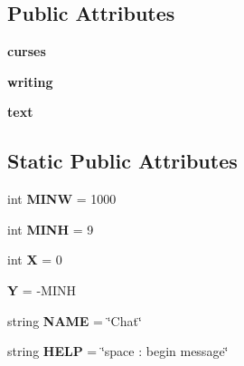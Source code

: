 \subsection*{\-Public \-Attributes}
\begin{DoxyCompactItemize}
\item 
\hypertarget{classplugins_1_1chatcurses_1_1_chat_view_af4b6464f13631f2ace71c8df8af327a5}{{\bfseries curses}}\label{classplugins_1_1chatcurses_1_1_chat_view_af4b6464f13631f2ace71c8df8af327a5}

\item 
\hypertarget{classplugins_1_1chatcurses_1_1_chat_view_a9c13ec017f5022a2679d474b7baef095}{{\bfseries writing}}\label{classplugins_1_1chatcurses_1_1_chat_view_a9c13ec017f5022a2679d474b7baef095}

\item 
\hypertarget{classplugins_1_1chatcurses_1_1_chat_view_aa60bbf0e97d3dc2834fe57944bd6a865}{{\bfseries text}}\label{classplugins_1_1chatcurses_1_1_chat_view_aa60bbf0e97d3dc2834fe57944bd6a865}

\end{DoxyCompactItemize}
\subsection*{\-Static \-Public \-Attributes}
\begin{DoxyCompactItemize}
\item 
\hypertarget{classplugins_1_1chatcurses_1_1_chat_view_a1cd296631cf6060c3a3ac9e1c34882e2}{int {\bfseries \-M\-I\-N\-W} = 1000}\label{classplugins_1_1chatcurses_1_1_chat_view_a1cd296631cf6060c3a3ac9e1c34882e2}

\item 
\hypertarget{classplugins_1_1chatcurses_1_1_chat_view_a03159bec7fdc92a2eeab868722ebb841}{int {\bfseries \-M\-I\-N\-H} = 9}\label{classplugins_1_1chatcurses_1_1_chat_view_a03159bec7fdc92a2eeab868722ebb841}

\item 
\hypertarget{classplugins_1_1chatcurses_1_1_chat_view_ab2a1a6d2d6226842c31c1ab5f6df00da}{int {\bfseries \-X} = 0}\label{classplugins_1_1chatcurses_1_1_chat_view_ab2a1a6d2d6226842c31c1ab5f6df00da}

\item 
\hypertarget{classplugins_1_1chatcurses_1_1_chat_view_a711caa8e513889179c4395a3970654cf}{{\bfseries \-Y} = -\/\-M\-I\-N\-H}\label{classplugins_1_1chatcurses_1_1_chat_view_a711caa8e513889179c4395a3970654cf}

\item 
\hypertarget{classplugins_1_1chatcurses_1_1_chat_view_a3d39c317901fd43327f6bfa795ff27e2}{string {\bfseries \-N\-A\-M\-E} = \char`\"{}\-Chat\char`\"{}}\label{classplugins_1_1chatcurses_1_1_chat_view_a3d39c317901fd43327f6bfa795ff27e2}

\item 
\hypertarget{classplugins_1_1chatcurses_1_1_chat_view_aae45f6d26952be89fc2c3924e450c2ee}{string {\bfseries \-H\-E\-L\-P} = \char`\"{}space \-: begin message\char`\"{}}\label{classplugins_1_1chatcurses_1_1_chat_view_aae45f6d26952be89fc2c3924e450c2ee}

\end{DoxyCompactItemize}


